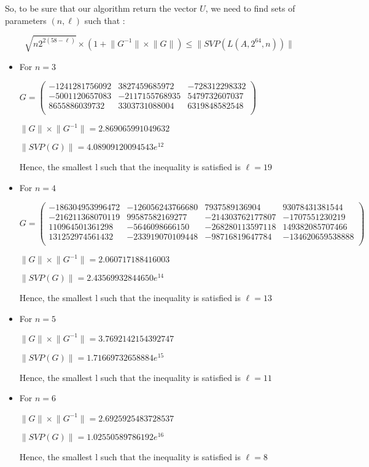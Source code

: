 \documentclass[preprint,svgnames]{iacrtrans}
\begin{document}
So, to be sure that our algorithm return the vector \(U\), we need to find sets of parameters \((n,\ell)\) such that :	 

\[\sqrt{n2^{2(58-\ell)}} \times (1 +\lVert G^{-1} \rVert  \times \lVert G\rVert) \leqslant \lVert SVP(L(A,2^{64},n))\rVert \]

\begin{itemize}
	\item For \(n=3\)
	
	\(G = \begin{pmatrix}
	-1241281756092&3827459685972&-728312298332\\
	-5001120657083&-2117155768935&5479732607037\\
	8655886039732&3303731088004&6319848582548\\
	\end{pmatrix}\)
	
	\(\lVert G \rVert \times \lVert G^{-1} \rVert = 2.869065991049632\)
	
	\(\lVert SVP(G) \rVert = 4.08909120094543e{^12}\)
	
	Hence, the smallest l such that the inequality is satisfied is \(\ell = 19\) %
	
	\item For \(n=4\)
	
	\(G = \begin{pmatrix}
	-186304953996472&-126056243766680&7937589136904&93078431381544\\
	-216211368070119&99587582169277&-214303762177807&-1707551230219\\
	110964501361298&-5646098666150&-268280113597118&149382085707466\\
	131252974561432&-233919070109448&-98716819647784&-134620659538888\\
	\end{pmatrix}\)
	
	\(\lVert G \rVert \times \lVert G^{-1} \rVert = 2.060717188416003\)
	
	\(\lVert SVP(G) \rVert = 2.43569932844650e^{14}\)
	
	Hence, the smallest l such that the inequality is satisfied is \(\ell = 13\) %
	
	\item For \(n=5\)
	
	\(\lVert G \rVert \times \lVert G^{-1} \rVert = 3.7692142154392747\)
	
	\(\lVert SVP(G) \rVert = 1.71669732658884e^{15}\)
	
	Hence, the smallest l such that the inequality is satisfied is \(\ell = 11\)  %
	
	\item For \(n=6\)
	
	\(\lVert G \rVert \times \lVert G^{-1} \rVert = 2.6925925483728537\)
	
	\(\lVert SVP(G) \rVert =1.02550589786192e^{16}\)
	
	Hence, the smallest l such that the inequality is satisfied is \(\ell = 8\) %
\end{itemize}
\end{document}
